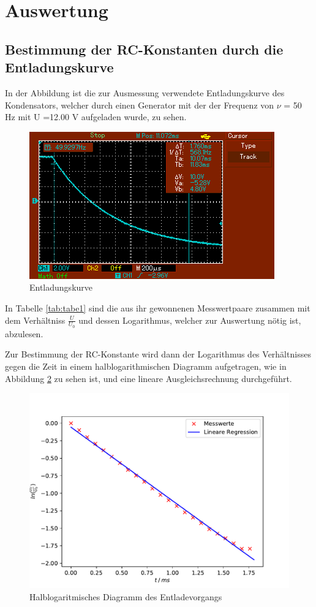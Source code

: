 \section{Auswertung}
\subsection{Bestimmung der RC-Konstanten durch die Entladungskurve}
In der Abbildung %
ist die zur Ausmessung verwendete Entladungskurve des Kondensators, welcher
durch einen Generator mit der der Frequenz von $\nu$ = 50 $\si{\hertz}$ mit
 U =12.00 $\si{\volt}$ aufgeladen wurde, zu sehen.
\begin{figure}[H]
  \centering
  \includegraphics{kurve}
  \caption{Entladungskurve}
  \label{fig:kurve}
\end{figure}
\noindent In Tabelle \ref{tab:tabe1} sind die aus ihr gewonnenen Messwertpaare zusammen mit
dem Verhältniss $ \frac{U}{U_0} $ und dessen Logarithmus, welcher zur
Auswertung nötig ist, abzulesen.

\noindent Zur Bestimmung der RC-Konstante wird dann der Logarithmus des Verhältnisses gegen
die Zeit in einem halblogarithmischen Diagramm aufgetragen, wie in Abbildung
\ref{fig:gerade} zu sehen ist, und eine lineare Ausgleichsrechnung durchgeführt.
\begin{figure}[H]
  \centering
  \includegraphics{plot1.pdf}
  \caption{Halblogaritmisches Diagramm des Entladevorgangs}
  \label{fig:gerade}
\end{figure}
